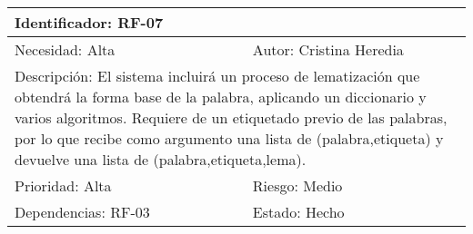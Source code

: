 \begin{table}[H]
\label{my-label}
\begin{tabular}{|l|l|l|l|l|l|l|}
\hline
\multicolumn{7}{|l|}{\textcolor{SchoolColor}{Identificador:} RF-07}                                 \\ \hline
\multicolumn{4}{|l|}{\textcolor{SchoolColor}{Necesidad:} Alta} & \multicolumn{3}{l|}{\textcolor{SchoolColor}{Autor:} Cristina Heredia}         \\ \hline
\multicolumn{7}{|L|}{\textcolor{SchoolColor}{Descripción:} El sistema incluirá un proceso de lematización que obtendrá la forma base de la palabra, aplicando un diccionario y varios algoritmos. 
Requiere de un etiquetado previo de las palabras, por lo que recibe como argumento una lista de (palabra,etiqueta) y devuelve una lista de (palabra,etiqueta,lema). }                                 \\ \hline
\multicolumn{4}{|l|}{\textcolor{SchoolColor}{Prioridad: }Alta} & \multicolumn{3}{l|}{\textcolor{SchoolColor}{Riesgo:} Medio}         \\ \hline
\multicolumn{5}{|l|}{\textcolor{SchoolColor}{Dependencias: }RF-03 }         & \multicolumn{2}{l|}{\textcolor{SchoolColor}{Estado:} Hecho} \\ \hline
\end{tabular}
\end{table}







